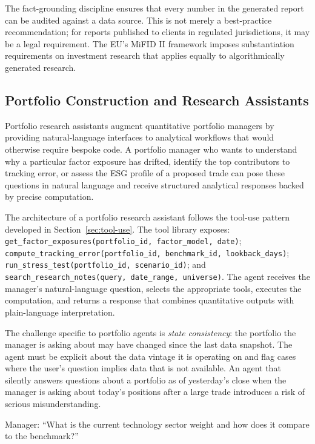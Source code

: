 \begin{context}
The fact-grounding discipline ensures that every number in the generated report can be
audited against a data source. This is not merely a best-practice recommendation; for
reports published to clients in regulated jurisdictions, it may be a legal requirement.
The EU's MiFID II framework imposes substantiation requirements on investment research
that applies equally to algorithmically generated research.


\subsection{Portfolio Construction and Research Assistants}
\label{subsec:portfolio-agents}

Portfolio research assistants augment quantitative portfolio managers by providing
natural-language interfaces to analytical workflows that would otherwise require
bespoke code. A portfolio manager who wants to understand why a particular factor
exposure has drifted, identify the top contributors to tracking error, or assess the
ESG profile of a proposed trade can pose these questions in natural language and receive
structured analytical responses backed by precise computation.

The architecture of a portfolio research assistant follows the tool-use pattern
developed in Section~\ref{sec:tool-use}. The tool library exposes:
\texttt{get\_factor\_exposures(portfolio\_id, factor\_model, date)};
\texttt{compute\_tracking\_error(portfolio\_id, benchmark\_id, lookback\_days)};
\texttt{run\_stress\_test(portfolio\_id, scenario\_id)};
and \texttt{search\_research\_notes(query, date\_range, universe)}.
The agent receives the manager's natural-language question, selects the appropriate
tools, executes the computation, and returns a response that combines quantitative
outputs with plain-language interpretation.

The challenge specific to portfolio agents is \emph{state consistency}: the portfolio
the manager is asking about may have changed since the last data snapshot. The agent
must be explicit about the data vintage it is operating on and flag cases where the
user's question implies data that is not available. An agent that silently answers
questions about a portfolio as of yesterday's close when the manager is asking about
today's positions after a large trade introduces a risk of serious misunderstanding.

\begin{example}
\label{ex:portfolio-qa}
Manager: ``What is the current technology sector weight and how does it compare to the
benchmark?''


\end{example}
\end{context}
